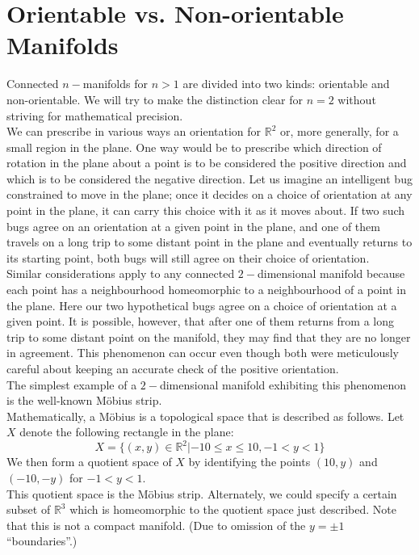\documentclass{article}
\theoremstyle{definition}
\begin{document}
\section{Orientable vs. Non-orientable Manifolds}
%
Connected $n-$manifolds for $n > 1$ are divided into two kinds: orientable and non-orientable. We will try to make the distinction clear for $n = 2$ without striving for mathematical precision.\\
We can prescribe in various ways an orientation for $\mathbb{R}^2$ or, more generally, for a small region in the plane. One way would be to prescribe which direction of rotation in the plane about a point is to be considered the positive direction and which is to be considered the negative direction. Let us imagine an intelligent bug constrained to move in the plane; once it decides on a choice of orientation at any point in the plane, it can carry this choice with it as it moves about. If two such bugs agree on an orientation at a given point in the plane, and one of them travels on a long trip to some distant point in the plane and eventually returns to its starting point, both bugs will still agree on their choice of orientation.\\
Similar considerations apply to any connected $2-$dimensional manifold because each point has a neighbourhood homeomorphic to a neighbourhood of a point in the plane. Here our two hypothetical bugs agree on a choice of orientation at a given point. It is possible, however, that after one of them returns from a long trip to some distant point on the manifold, they may find that they are no longer in agreement. This phenomenon can occur even though both were meticulously careful about keeping an accurate check of the positive orientation.\\
The simplest example of a $2-$dimensional manifold exhibiting this phenomenon is the well-known M\"{o}bius strip.\\
Mathematically, a M\"{o}bius is a topological space that is described as follows. Let $X$ denote the following rectangle in the plane:
\[X = \{(x, y) \in \mathbb{R}^2| -10 \le x \le 10, -1 < y < 1\}\]
We then form a quotient space of $X$ by identifying the points $(10, y)$ and $(-10, -y)$ for $-1 < y < 1.$\\
This quotient space is the M\"{o}bius strip. Alternately, we could specify a certain subset of $\mathbb{R}^3$ which is homeomorphic to the quotient space just described. Note that this is not a compact manifold. (Due to omission of the $y=\pm1$ ``boundaries''.)\\
\end{document}
